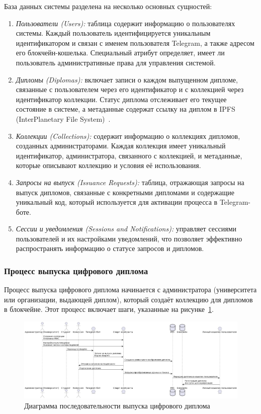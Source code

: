 База данных системы разделена на несколько основных сущностей:

\begin{enumerate}
    \item \textit{Пользователи (Users):} таблица содержит информацию о пользователях системы. Каждый пользователь идентифицируется уникальным идентификатором и связан с именем пользователя Telegram, а также адресом его блокчейн-кошелька. Специальный атрибут определяет, имеет ли пользователь административные права для управления системой.
    \item \textit{Дипломы (Diplomas):} включает записи о каждом выпущенном дипломе, связанные с пользователем через его идентификатор и с коллекцией через идентификатор коллекции. Статус диплома отслеживает его текущее состояние в системе, а метаданные содержат ссылку на диплом в IPFS (InterPlanetary File System)~\cite{bib:ipfs_is}.
    \item \textit{Коллекции (Collections):} содержит информацию о коллекциях дипломов, созданных администраторами. Каждая коллекция имеет уникальный идентификатор, администратора, связанного с коллекцией, и метаданные, которые описывают коллекцию и условия её использования.
    \item \textit{Запросы на выпуск (Issuance Requests):} таблица, отражающая запросы на выпуск дипломов, связанные с конкретными дипломами и содержащие уникальный код, который используется для активации процесса в Telegram-боте.
    \item \textit{Сессии и уведомления (Sessions and Notifications):} управляет сессиями пользователей и их настройками уведомлений, что позволяет эффективно распространять информацию о статусе запросов и дипломов.
\end{enumerate}

\subsubsection{Процесс выпуска цифрового диплома}

Процесс выпуска цифрового диплома начинается с администратора (университета или организации, выдающей диплом), который создаёт коллекцию для дипломов в блокчейне. Этот процесс включает шаги, указанные на рисунке~\ref{fig:diploma_issue}.

\begin{figure}[H]
	\centering
	\includegraphics[width=.9\textwidth]{images/diploma_issue.png}
	\parskip=6pt
	\caption{Диаграмма последовательности выпуска цифрового диплома}
	\label{fig:diploma_issue}
\end{figure}

